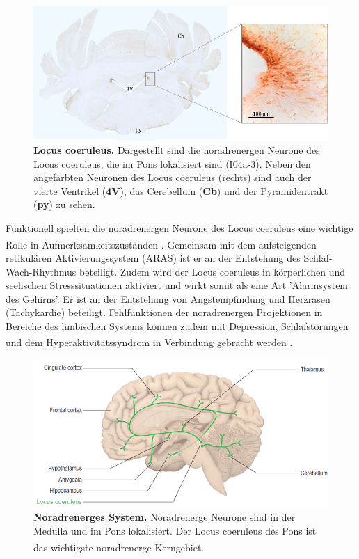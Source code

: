 \documentclass[12pt,a4paper,pdftex]{article}
\begin{document}
\begin{figure}[H]
    \centering
    \includegraphics[width=\textwidth]{pictures/Bilder_monoamine_systeme/locus_coeruleus.png}
    \caption[Locus coeruleus]{\textbf{Locus coeruleus.} Dargestellt sind die noradrenergen Neurone des Locus coeruleus, die im Pons lokalisiert sind (I04a-3). Neben den angefärbten Neuronen des Locus coeruleus (rechts) sind auch der vierte Ventrikel (\textbf{4V}), das Cerebellum (\textbf{Cb}) und der Pyramidentrakt (\textbf{py}) zu sehen.}
    \label{fig:locus_coeruleus}
\end{figure}

Funktionell spielten die noradrenergen Neurone des Locus coeruleus eine wichtige Rolle in Aufmerksamkeitszuständen \textsuperscript{\cite[46]{kandel2013principles}}. Gemeinsam mit dem aufsteigenden retikulären Aktivierungssystem (ARAS) ist er an der Entstehung des Schlaf-Wach-Rhythmus beteiligt. Zudem wird der Locus coeruleus in körperlichen und seelischen Stresssituationen aktiviert und wirkt somit als eine Art 'Alarmsystem des Gehirns'. Er ist an der Entstehung von Angstempfindung und Herzrasen (Tachykardie) beteiligt. Fehlfunktionen der noradrenergen Projektionen in Bereiche des limbischen Systems können zudem mit Depression, Schlafstörungen und dem Hyperaktivitätssyndrom in Verbindung gebracht werden \textsuperscript{\cite[6]{trepel2011neuroanatomie}}.

\begin{figure}[H]
    \centering
    \includegraphics[width=\textwidth]{pictures/Bilder_monoamine_systeme/noradrenerges_system.PNG}
    \caption[Noradrenerges System]{\textbf{Noradrenerges System.} Noradrenerge Neurone sind in der Medulla und im Pons lokalisiert. Der Locus coeruleus des Pons ist das wichtigste noradrenerge Kerngebiet. \textsuperscript{\cite[9]{crossman2014neuroanatomy}}}
    \label{fig:noradrenerges_system}
\end{figure}{}
\end{document}
